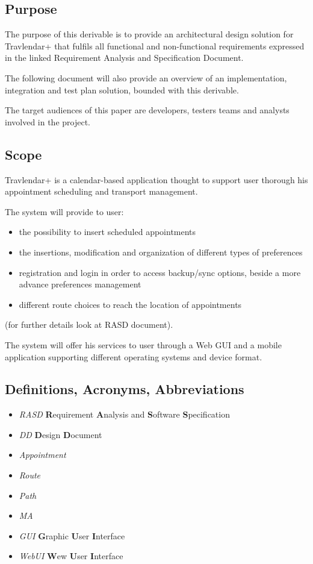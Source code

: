 \subsection{Purpose}

The purpose of this derivable is to provide an architectural design solution for Travlendar+ that fulfils all functional and non-functional requirements expressed in the linked Requirement Analysis and Specification Document.

The following document will also provide an overview of an implementation, integration and test plan solution, bounded with this derivable.

The target audiences of this paper are developers, testers teams and analysts involved in the project.

\subsection{Scope}

Travlendar+ is a calendar-based application thought to support user thorough his appointment scheduling and transport management.

The system will provide to user:

\begin{itemize}
	\item the possibility to insert scheduled appointments
	\item the insertions, modification and organization of different types of preferences
	\item registration and login in order to access backup/sync options, beside a more advance preferences management
	\item different route choices to reach the location of appointments
\end{itemize}

(for further details look at RASD document).

The system will offer his services to user through a Web GUI and a mobile application supporting different operating systems and device format.



\subsection{Definitions, Acronyms, Abbreviations}

\begin{itemize}
	\item \textsl{RASD} \textbf{R}equirement \textbf{A}nalysis and \textbf{S}oftware \textbf{S}pecification
	\item \textsl{DD} \textbf{D}esign \textbf{D}ocument
	\item \textsl{Appointment}
	\item \textsl{Route}
	\item \textsl{Path}
	\item \textsl{MA}
	\item \textsl{GUI} \textbf{G}raphic \textbf{U}ser \textbf{I}nterface
	\item \textsl{WebUI} \textbf{W}ew \textbf{U}ser \textbf{I}nterface
	
\end{itemize}

